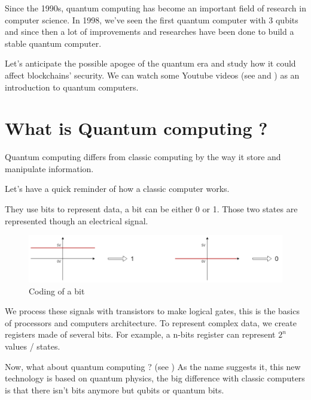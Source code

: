 Since the 1990s, quantum computing has become an important field of research in computer science. In 1998, we've seen the first quantum computer with 3 qubits and since then a lot of improvements and researches have been done to build a stable quantum computer. \newline

Let's anticipate the possible apogee of the quantum era and study how it could affect blockchains' security. We can watch some Youtube videos (see \cite{scienceEtonnante} and \cite{confTedEd}) as an introduction to quantum computers.

\section{What is Quantum computing ?}

Quantum computing differs from classic computing by the way it store and manipulate information. \newline

Let's have a quick reminder of how a classic computer works. \newline

They use bits to represent data, a bit can be either 0 or 1. Those two states are represented though an electrical signal. \newline

\begin{figure}[ht]
\centering
\includegraphics[width=14cm]{Figures/electricSignals}
\caption{Coding of a bit}
\end{figure}
\medskip

We process these signals with transistors to make logical gates, this is the basics of processors and computers architecture. To represent complex data, we create registers made of several bits. For example, a n-bits register can represent $2^n$ values / states. \newline

Now, what about quantum computing ? (see \cite{qubitWiki}) As the name suggests it, this new technology is based on quantum physics, the big difference with classic computers is that there isn't bits anymore but qubits or quantum bits. \newline

